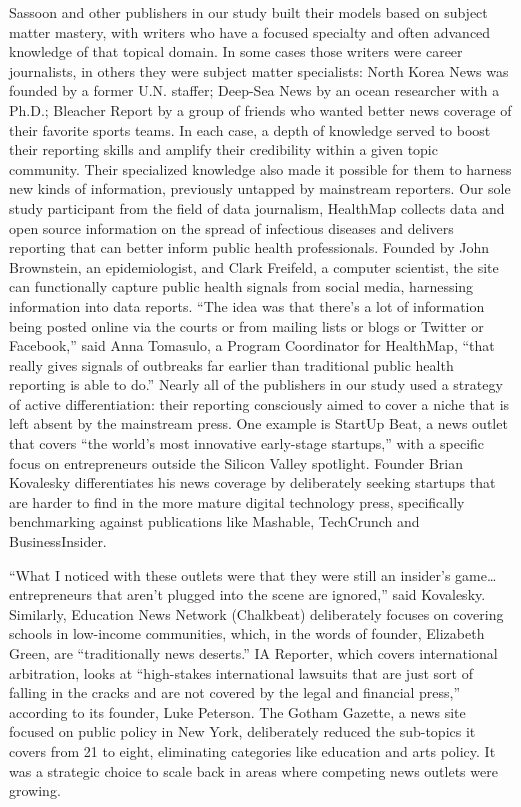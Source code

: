 Sassoon and other publishers in our study built their models based on subject
matter mastery, with writers who have a focused specialty and often
advanced knowledge of that topical domain. In some cases those writers
were career journalists, in others they were subject matter specialists:
North Korea News was founded by a former U.N. staffer; Deep-Sea News by
an ocean researcher with a Ph.D.; Bleacher Report by a group of friends who
wanted better news coverage of their favorite sports teams. In each case, a
depth of knowledge served to boost their reporting skills and amplify their
credibility within a given topic community.
Their specialized knowledge also made it possible for them to harness new
kinds of information, previously untapped by mainstream reporters. Our
sole study participant from the field of data journalism, HealthMap collects
data and open source information on the spread of infectious diseases
and delivers reporting that can better inform public health professionals.
Founded by John Brownstein, an epidemiologist, and Clark Freifeld, a computer
scientist, the site can functionally capture public health signals from
social media, harnessing information into data reports.
``The idea was that there’s a lot of information being posted online via the
courts or from mailing lists or blogs or Twitter or Facebook,'' said Anna
Tomasulo, a Program Coordinator for HealthMap, ``that really gives signals
of outbreaks far earlier than traditional public health reporting is
able to do.''
Nearly all of the publishers in our study used a strategy of active differentiation:
their reporting consciously aimed to cover a niche that is left absent
by the mainstream press. One example is StartUp Beat, a news outlet that
covers ``the world’s most innovative early-stage startups,'' with a specific
focus on entrepreneurs outside the Silicon Valley spotlight. Founder Brian
Kovalesky differentiates his news coverage by deliberately seeking startups
that are harder to find in the more mature digital technology press,
specifically benchmarking against publications like Mashable, TechCrunch
and BusinessInsider.

``What I noticed with these outlets were that they were still an insider’s
game…entrepreneurs that aren’t plugged into the scene are ignored,''
said Kovalesky.
Similarly, Education News Network (Chalkbeat) deliberately focuses
on covering schools in low-income communities, which, in the words of
founder, Elizabeth Green, are ``traditionally news deserts.'' IA Reporter,
which covers international arbitration, looks at ``high-stakes international
lawsuits that are just sort of falling in the cracks and are not covered by
the legal and financial press,'' according to its founder, Luke Peterson. The
Gotham Gazette, a news site focused on public policy in New York, deliberately
reduced the sub-topics it covers from 21 to eight, eliminating categories
like education and arts policy. It was a strategic choice to scale back in
areas where competing news outlets were growing.


